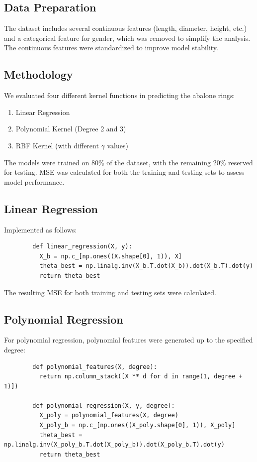 \documentclass{article}
\begin{document}
	\subsection*{Data Preparation}
	The dataset includes several continuous features (length, diameter, height, etc.) and a categorical feature for gender, which was removed to simplify the analysis. The continuous features were standardized to improve model stability.
	
	\subsection*{Methodology}
	We evaluated four different kernel functions in predicting the abalone rings:
	\begin{enumerate}
		\item Linear Regression
		\item Polynomial Kernel (Degree 2 and 3)
		\item RBF Kernel (with different $\gamma$ values)
	\end{enumerate}
	
	The models were trained on 80\% of the dataset, with the remaining 20\% reserved for testing. MSE was calculated for both the training and testing sets to assess model performance.
	
	\subsection*{Linear Regression}
	Implemented as follows:
	\begin{verbatim}
		def linear_regression(X, y):
		  X_b = np.c_[np.ones((X.shape[0], 1)), X]
		  theta_best = np.linalg.inv(X_b.T.dot(X_b)).dot(X_b.T).dot(y)
		  return theta_best
	\end{verbatim}
	The resulting MSE for both training and testing sets were calculated.
	
	\subsection*{Polynomial Regression}
	For polynomial regression, polynomial features were generated up to the specified degree:
	\begin{verbatim}
		def polynomial_features(X, degree):
		  return np.column_stack([X ** d for d in range(1, degree + 1)])
		
		def polynomial_regression(X, y, degree):
		  X_poly = polynomial_features(X, degree)
		  X_poly_b = np.c_[np.ones((X_poly.shape[0], 1)), X_poly]
		  theta_best = np.linalg.inv(X_poly_b.T.dot(X_poly_b)).dot(X_poly_b.T).dot(y)
		  return theta_best
	\end{verbatim}
	
\end{document}
